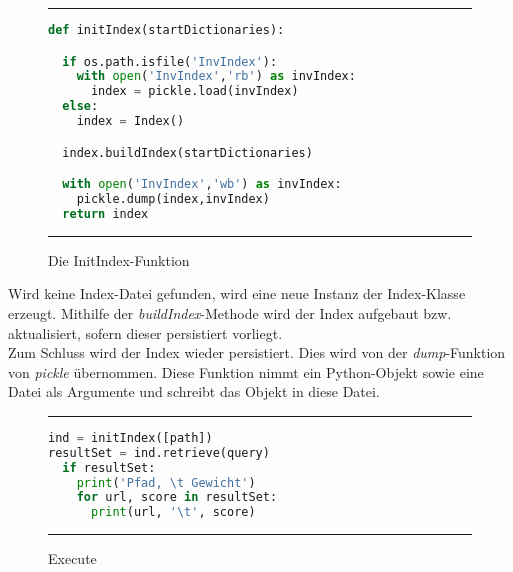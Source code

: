 \begin{figure}
	\rule{\textwidth}{0.4pt}
	\begin{lstlisting}[language=Python]
def initIndex(startDictionaries):

  if os.path.isfile('InvIndex'):
    with open('InvIndex','rb') as invIndex:
      index = pickle.load(invIndex)
  else:
    index = Index()

  index.buildIndex(startDictionaries)

  with open('InvIndex','wb') as invIndex:
    pickle.dump(index,invIndex)
  return index
	\end{lstlisting}
	\rule{\textwidth}{0.4pt}
	\caption{Die InitIndex-Funktion}
	\label{fig:initIndex}
\end{figure}

Wird keine Index-Datei gefunden, wird eine neue Instanz der Index-Klasse erzeugt. Mithilfe der \textit{buildIndex}-Methode wird der Index aufgebaut bzw. aktualisiert, sofern dieser persistiert vorliegt.
\\
Zum Schluss wird der Index wieder persistiert. Dies wird von der \textit{dump}-Funktion von \textit{pickle} übernommen. Diese Funktion nimmt ein Python-Objekt sowie eine Datei als Argumente und schreibt das Objekt in diese Datei.

\begin{figure}
	\rule{\textwidth}{0.4pt}
		\begin{lstlisting}[language=Python]
ind = initIndex([path])
resultSet = ind.retrieve(query)
  if resultSet:
    print('Pfad, \t Gewicht')
    for url, score in resultSet:
      print(url, '\t', score)
		\end{lstlisting}
	\rule{\textwidth}{0.4pt}
	\caption{Execute}
	\label{fig:execute}
\end{figure}
